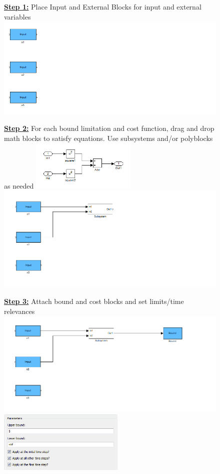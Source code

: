 \documentclass[12pt]{report}
\newcommand{\textbu}[1]{\textbf{\underline{#1}}}
\begin{document}
\begin{figure}[H]
\textbu{Step 1:} Place Input and External Blocks for input and external variables
\center
\includegraphics[width=120mm]{figures/Example_Step1.png}
\end{figure}
\begin{figure}[H]
\textbu{Step 2:} For each bound limitation and cost function, drag and drop math blocks to satisfy equations.  Use subsystems and/or polyblocks as needed
\center
\includegraphics[width=50mm]{figures/Example_Step2_1_subsys.png}
\includegraphics[width=120mm]{figures/Example_Step2_1.png}
\end{figure}
\begin{figure}[H]
\textbu{Step 3:} Attach bound and cost blocks and set limits/time relevances
\center
\includegraphics[width=120mm]{figures/Example_Step3_1.png}
\includegraphics[width=60mm]{figures/Example_Step3_1_bound.png}
\end{figure}
\end{document}
